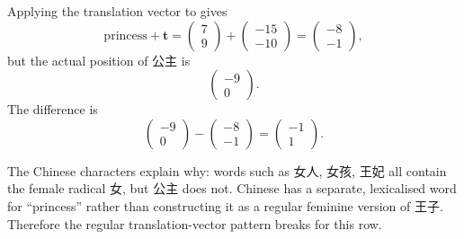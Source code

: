 \documentclass[12pt]{ctexart}
\newcommand{\colvec}[2]{\begin{pmatrix} #1 \\ #2 \end{pmatrix}}
\begin{document}
\begin{enumerate}[label=\textbf{\arabic*.}]
Applying the translation vector to  gives
\[
\text{princess}+\mathbf{t}
=\colvec{7}{9}+\colvec{-15}{-10}
=\colvec{-8}{-1},
\]
but the actual position of 公主 is
\[
\colvec{-9}{0}.
\]
The difference is
\[
\colvec{-9}{0}-\colvec{-8}{-1}
=\colvec{-1}{1}.
\]

The Chinese characters explain why: words such as 女人, 女孩, 王妃 all contain the female radical 女, but 公主 does not. Chinese has a separate, lexicalised word for “princess” rather than constructing it as a regular feminine version of 王子. Therefore the regular translation-vector pattern breaks for this row.
\end{enumerate}
\end{document}
